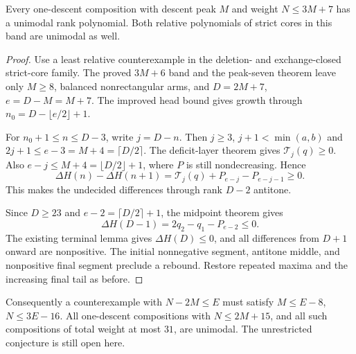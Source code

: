 \begin{theorem}
Every one-descent composition with descent peak $M$ and weight
$N\le3M+7$ has a unimodal rank polynomial. Both relative polynomials
of strict cores in this band are unimodal as well.
\end{theorem}
\begin{proof}
Use a least relative counterexample in the deletion- and exchange-closed
strict-core family. The proved $3M+6$ band and the peak-seven theorem
leave only $M\ge8$, balanced nonrectangular arms, and
$D=2M+7$, $e=D-M=M+7$.
The improved head bound gives growth through
$n_0=D-\lfloor e/2\rfloor+1$.

For $n_0+1\le n\le D-3$, write $j=D-n$. Then
$j\ge3$, $j+1<\min(a,b)$ and
$2j+1\le e-3=M+4=\lceil D/2\rceil$.
The deficit-layer theorem gives $\mathcal T_j(q)\ge0$.
Also $e-j\le M+4=\lfloor D/2\rfloor+1$, where $P$ is still
nondecreasing. Hence
\[
 \Delta H(n)-\Delta H(n+1)
 =\mathcal T_j(q)+P_{e-j}-P_{e-j-1}\ge0.
\]
This makes the undecided differences through rank $D-2$ antitone.

Since $D\ge23$ and $e-2=\lceil D/2\rceil+1$, the midpoint theorem gives
\[
 \Delta H(D-1)=2q_2-q_1-P_{e-2}\le0.
\]
The existing terminal lemma gives $\Delta H(D)\le0$, and all differences
from $D+1$ onward are nonpositive. The initial nonnegative segment,
antitone middle, and nonpositive final segment preclude a rebound.
Restore repeated maxima and the increasing final tail as before.
\end{proof}

Consequently a counterexample with $N-2M\le E$ must satisfy
$M\le E-8$, $N\le3E-16$. All one-descent compositions with
$N\le2M+15$, and all such compositions of total weight at most
$31$, are unimodal. The unrestricted conjecture is still open here.
